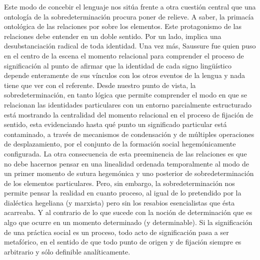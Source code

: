 Este modo de concebir el lenguaje nos sitúa frente a otra cuestión central que una ontología de la sobredeterminación procura poner de relieve. A saber, la primacía ontológica de las relaciones por sobre los elementos. Este protagonismo de las relaciones debe entender en un doble sentido. Por un lado, implica una desubstanciación radical de toda identidad. Una vez más, Saussure fue quien puso en el centro de la escena el momento relacional para comprender el proceso de significación al punto de afirmar que la identidad de cada signo lingüístico depende enteramente de sus vínculos  con los otros eventos de la lengua y nada tiene que ver con el referente. Desde nuestro punto de vista, la sobredeterminación, en tanto lógica que permite comprender el modo en que se relacionan las identidades particulares con un entorno parcialmente estructurado está mostrando la centralidad del momento relacional en el proceso de fijación de sentido, esta evidenciando hasta qué punto un significado particular está contaminado, a través de mecanismos de condensación y de múltiples operaciones de desplazamiento, por el conjunto de la formación social hegemónicamente configurada. La otra consecuencia de esta preeminencia de las relaciones es que no debe hacernos pensar en una linealidad ordenada temporalmente al modo de un primer momento de sutura hegemónica y uno posterior de sobredeterminación de los elementos particulares. Pero, sin embargo, la sobredeterminación nos permite pensar la realidad en cuanto proceso, al igual de lo pretendido por la dialéctica hegeliana (y marxista) pero sin los resabios esencialistas que ésta acarreaba. Y al contrario de lo que sucede con la noción de determinación que es algo que ocurre en un momento determinado (y determinable). Si la significación de una práctica social es un proceso, todo acto de significación pasa a ser metafórico, en el sentido de que todo punto de origen y de fijación siempre es arbitrario y sólo definible analíticamente.

